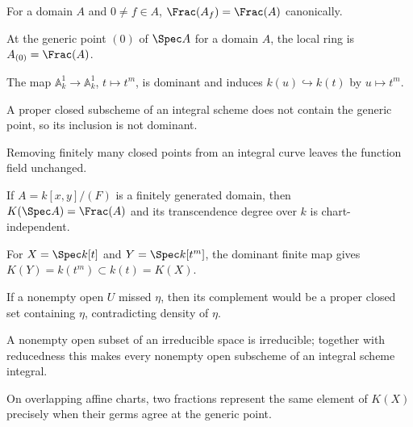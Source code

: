 \begin{example}\label{ex:vi27-11}
For a domain $A$ and $0\ne f\in A$, $\Frac(A_f)=\Frac(A)$ canonically.
\end{example}

\begin{example}\label{ex:vi27-12}
At the generic point $(0)$ of $\Spec A$ for a domain $A$, the local ring is $A_{(0)}=\Frac(A)$.
\end{example}

\begin{example}\label{ex:vi27-13}
The map $\mathbb A^1_k\to\mathbb A^1_k$, $t\mapsto t^m$, is dominant and induces $k(u)\hookrightarrow k(t)$ by $u\mapsto t^m$.
\end{example}

\begin{example}\label{ex:vi27-14}
A proper closed subscheme of an integral scheme does not contain the generic point, so its inclusion is not dominant.
\end{example}

\begin{example}\label{ex:vi27-15}
Removing finitely many closed points from an integral curve leaves the function field unchanged.
\end{example}

\begin{example}\label{ex:vi27-16}
If $A=k[x,y]/(F)$ is a finitely generated domain, then $K(\Spec A)=\Frac(A)$ and its transcendence degree over $k$ is chart-independent.
\end{example}

\begin{example}\label{ex:vi27-17}
For $X=\Spec k[t]$ and $Y=\Spec k[t^m]$, the dominant finite map gives $K(Y)=k(t^m)\subset k(t)=K(X)$.
\end{example}

\begin{example}\label{ex:vi27-18}
If a nonempty open $U$ missed $\eta$, then its complement would be a proper closed set containing $\eta$, contradicting density of $\eta$.
\end{example}

\begin{example}\label{ex:vi27-19}
A nonempty open subset of an irreducible space is irreducible; together with reducedness this makes every nonempty open subscheme of an integral scheme integral.
\end{example}

\begin{example}\label{ex:vi27-20}
On overlapping affine charts, two fractions represent the same element of $K(X)$ precisely when their germs agree at the generic point.
\end{example}
